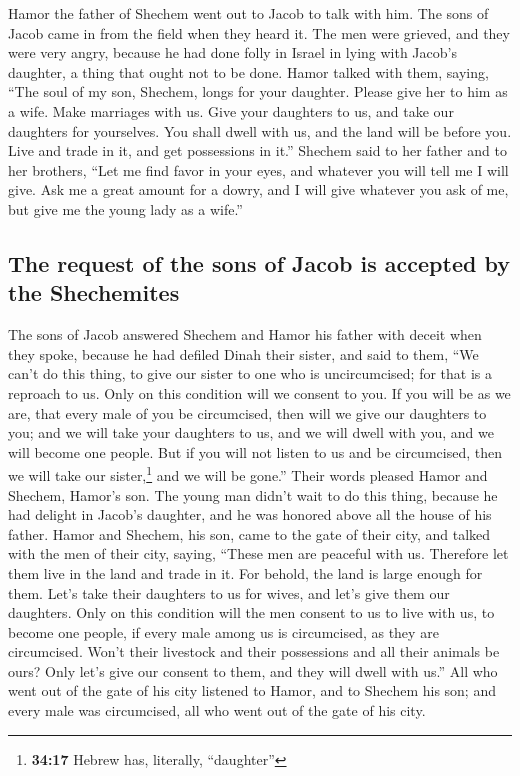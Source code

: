  Hamor the father of Shechem went out to Jacob to talk
with him.  The sons of Jacob came in from the field when
they heard it. The men were grieved, and they were very angry, because
he had done folly in Israel in lying with Jacob's daughter, a thing that
ought not to be done.  Hamor talked with them, saying,
``The soul of my son, Shechem, longs for your daughter. Please give her
to him as a wife.  Make marriages with us. Give your
daughters to us, and take our daughters for yourselves. 
You shall dwell with us, and the land will be before you. Live and trade
in it, and get possessions in it.''  Shechem said to her
father and to her brothers, ``Let me find favor in your eyes, and
whatever you will tell me I will give.  Ask me a great
amount for a dowry, and I will give whatever you ask of me, but give me
the young lady as a wife.''

\hypertarget{the-request-of-the-sons-of-jacob-is-accepted-by-the-shechemites}{%
\subsection{The request of the sons of Jacob is accepted by the
Shechemites}\label{the-request-of-the-sons-of-jacob-is-accepted-by-the-shechemites}}

 The sons of Jacob answered Shechem and Hamor his father
with deceit when they spoke, because he had defiled Dinah their sister,
 and said to them, ``We can't do this thing, to give our
sister to one who is uncircumcised; for that is a reproach to us.
 Only on this condition will we consent to you. If you
will be as we are, that every male of you be circumcised,
 then will we give our daughters to you; and we will take
your daughters to us, and we will dwell with you, and we will become one
people.  But if you will not listen to us and be
circumcised, then we will take our sister,\footnote{\textbf{34:17}
  Hebrew has, literally, ``daughter''} and we will be gone.''
 Their words pleased Hamor and Shechem, Hamor's son.
 The young man didn't wait to do this thing, because he
had delight in Jacob's daughter, and he was honored above all the house
of his father.  Hamor and Shechem, his son, came to the
gate of their city, and talked with the men of their city, saying,
 ``These men are peaceful with us. Therefore let them
live in the land and trade in it. For behold, the land is large enough
for them. Let's take their daughters to us for wives, and let's give
them our daughters.  Only on this condition will the men
consent to us to live with us, to become one people, if every male among
us is circumcised, as they are circumcised.  Won't their
livestock and their possessions and all their animals be ours? Only
let's give our consent to them, and they will dwell with us.''
 All who went out of the gate of his city listened to
Hamor, and to Shechem his son; and every male was circumcised, all who
went out of the gate of his city.

